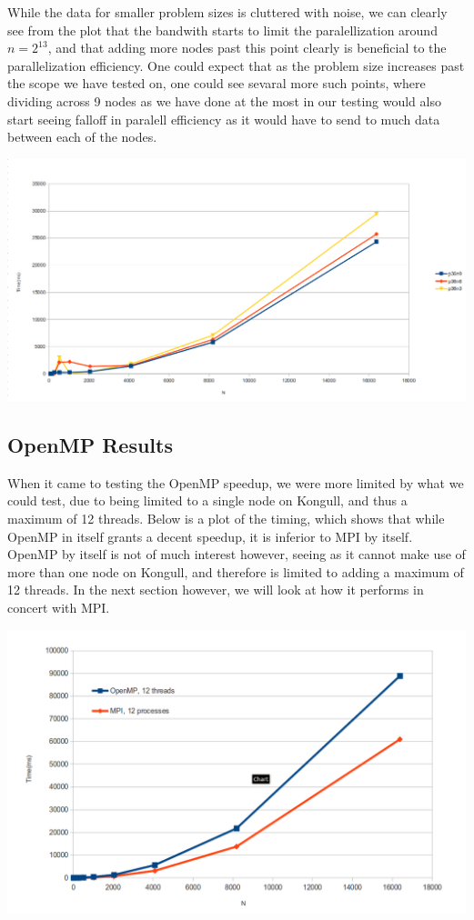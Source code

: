\documentclass[fontsize=11pt,paper=a4,titlepage]{article}
\begin{document}
While the data for smaller problem sizes is cluttered with noise, we can clearly see from the plot that the bandwith starts to limit the paralellization around $n = 2^{13}$, and that adding more nodes past this point clearly is beneficial to the parallelization efficiency. One could expect that as the problem size increases past the scope we have tested on, one could see sevaral more such points, where dividing across 9 nodes as we have done at the most in our testing would also start seeing falloff in paralell efficiency as it would have to send to much data between each of the nodes.

\hspace*{-1.5cm}\includegraphics[scale=0.6]{pics/p36nX.png}

\newpage
\subsection{OpenMP Results}
When it came to testing the OpenMP speedup, we were more limited by what we could test, due to being limited to a single node on Kongull, and thus a maximum of 12 threads. Below is a plot of the timing, which shows that while OpenMP in itself grants a decent speedup, it is inferior to MPI by itself. OpenMP by itself is not of much interest however, seeing as it cannot make use of more than one node on Kongull, and therefore is limited to adding a maximum of 12 threads. In the next section however, we will look at how it performs in concert with MPI.

\hspace*{-1.7cm}\includegraphics[scale=0.6]{pics/omp.png}
\newpage
\end{document}
